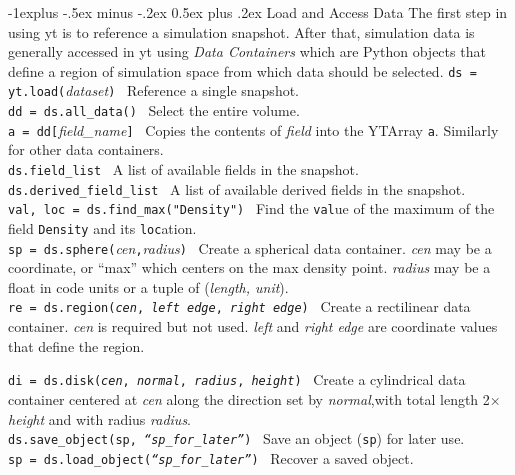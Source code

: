 \documentclass[10pt,landscape]{article}
\makeatletter
\renewcommand{\subsection}{\@startsection{subsection}{2}{0mm}%
                                {-1explus -.5ex minus -.2ex}%
                                {0.5ex plus .2ex}%
                                {\normalfont\normalsize\bfseries}}
\makeatother
\begin{document}
\begin{multicols}{3}
\subsection{Load and Access Data}
The first step in using yt is to reference a simulation snapshot.
After that, simulation data is generally accessed in yt using \textit{Data Containers} which are Python objects
that define a region of simulation space from which data should be selected.
\texttt{ds = yt.load(}\textit{dataset}\texttt{)} \textemdash\   Reference a single snapshot.\\
\texttt{dd = ds.all\_data()} \textemdash\ Select the entire volume.\\
\texttt{a = dd[}\textit{field\_name}\texttt{]} \textemdash\ Copies the contents of \textit{field} into the
YTArray \texttt{a}. Similarly for other data containers.\\
\texttt{ds.field\_list} \textemdash\ A list of available fields in the snapshot. \\
\texttt{ds.derived\_field\_list} \textemdash\ A list of available derived fields
in the snapshot. \\
\texttt{val, loc = ds.find\_max("Density")} \textemdash\ Find the \texttt{val}ue of
the maximum of the field \texttt{Density} and its \texttt{loc}ation. \\
\texttt{sp = ds.sphere(}\textit{cen}\texttt{,}\textit{radius}\texttt{)} \textemdash\   Create a spherical data
container. \textit{cen} may be a coordinate, or ``max'' which
centers on the max density point. \textit{radius} may be a float in
code units or a tuple of (\textit{length, unit}).\\

\texttt{re = ds.region(\textit{cen}, \textit{left edge}, \textit{right edge})} \textemdash\ Create a
rectilinear data container. \textit{cen} is required but not used.
\textit{left} and \textit{right edge} are coordinate values that define the region.

\texttt{di = ds.disk(\textit{cen}, \textit{normal}, \textit{radius}, \textit{height})} \textemdash\
Create a cylindrical data container centered at \textit{cen} along the
direction set by \textit{normal},with total length
 2$\times$\textit{height} and with radius \textit{radius}. \\

\texttt{ds.save\_object(sp, \textit{``sp\_for\_later''})} \textemdash\ Save an object (\texttt{sp}) for later use.\\
\texttt{sp = ds.load\_object(\textit{``sp\_for\_later''})} \textemdash\ Recover a saved object.\\



\end{multicols}
\end{document}
